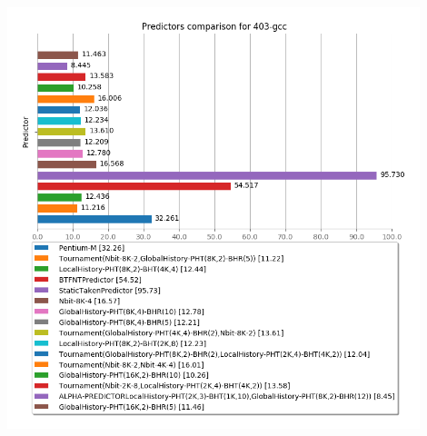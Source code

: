    \begin{minipage}{\textwidth}
      \begin{center}
         \\
         \vspace{3mm}
         \includegraphics[width=0.9\textwidth, frame]{./graphs/4-5/403-gcc.png}
         \vspace{6mm}
      \end{center}
   \end{minipage}


